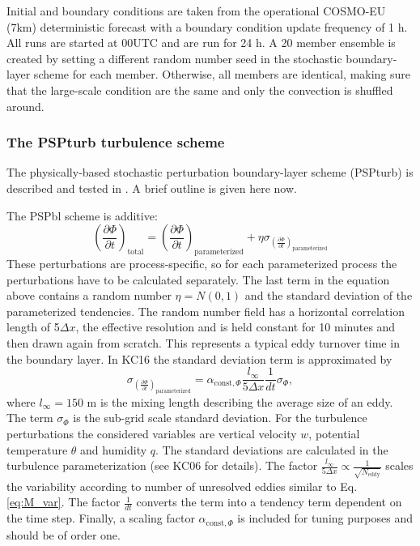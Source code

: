 \documentclass[a4paper, 12pt]{article}
\begin{document}
Initial and boundary conditions are taken from the operational COSMO-EU (7km) deterministic forecast with a boundary condition update frequency of 1 h. All runs are started at 00UTC and are run for 24 h. A 20 member ensemble is created by setting a different random number seed in the stochastic boundary-layer scheme for each member. Otherwise, all members are identical, making sure that the large-scale condition are the same and only the convection is shuffled around. 

\subsubsection{The PSPturb turbulence scheme}
The physically-based stochastic perturbation boundary-layer scheme (PSPturb) is described and tested in \cite[][KC16]{Kober2016}. A brief outline is given here now. 

The PSPbl scheme is additive:
\begin{equation} \label{eq:PSPturb_additive}
\left( \frac{\partial \Phi}{\partial t} \right)_{\mathrm{total}} = \left( \frac{\partial \Phi}{\partial t} \right)_{\mathrm{parameterized}} + \eta \sigma_{\left( \frac{\partial \Phi}{\partial t} \right)_{\mathrm{parameterized}}}
\end{equation}
These perturbations are process-specific, so for each parameterized process the perturbations have to be calculated separately. The last term in the equation above contains a random number $\eta = \mathit{N}(0,1)$ and the standard deviation of the parameterized tendencies. The random number field has a horizontal correlation length of 5$\Delta x$, the effective resolution and is held constant for 10 minutes and then drawn again from scratch. This represents a typical eddy turnover time in the boundary layer. In KC16 the standard deviation term is approximated by
\begin{equation} \label{eq:PSPturb_std}
\sigma_{\left( \frac{\partial \Phi}{\partial t} \right)_{\mathrm{parameterized}}} = \alpha_{\mathrm{const}, \Phi} \frac{\mathit{l_{\infty}}}{5 \Delta x}\frac{1}{dt} \sigma_{\Phi},
\end{equation}
where $\mathit{l_{\infty}} = 150$ m is the mixing length describing the average size of an eddy. The term $\sigma_{\Phi}$ is the sub-grid scale standard deviation. For the turbulence perturbations the considered variables are vertical velocity $w$, potential temperature $\theta$ and humidity $q$. The standard deviations are calculated in the turbulence parameterization (see KC06 for details). The factor $\frac{\mathit{l_{\infty}}}{5 \Delta x} \propto \frac{1}{\sqrt{N_{\mathrm{eddy}}}}$ scales the variability according to number of unresolved eddies similar to Eq. \ref{eq:M_var}. The factor $\frac{1}{dt}$  converts the term into a tendency term dependent on the time step. Finally, a scaling factor $\alpha_{\mathrm{const}, \Phi}$ is included for tuning purposes and should be of order one.
\end{document}
